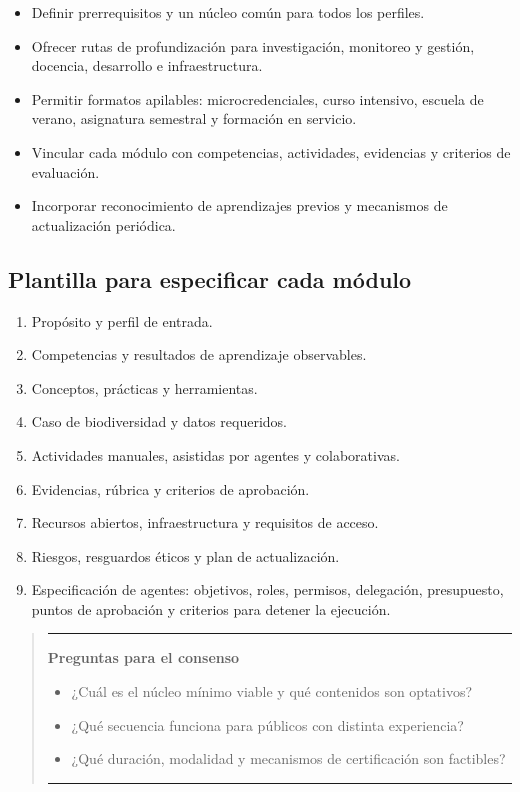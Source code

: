 \documentclass[11pt,a4paper]{article}
\newenvironment{preguntas}
  {\par\medskip\begin{quote}\color{azulieb}\hrule\smallskip
   \textbf{Preguntas para el consenso}\par\smallskip\begin{itemize}}
  {\end{itemize}\smallskip\hrule\end{quote}\par\medskip}
\begin{document}
\begin{itemize}
  \item Definir prerrequisitos y un núcleo común para todos los perfiles.
  \item Ofrecer rutas de profundización para investigación, monitoreo y gestión,
  docencia, desarrollo e infraestructura.
  \item Permitir formatos apilables: microcredenciales, curso intensivo, escuela
  de verano, asignatura semestral y formación en servicio.
  \item Vincular cada módulo con competencias, actividades, evidencias y criterios
  de evaluación.
  \item Incorporar reconocimiento de aprendizajes previos y mecanismos de
  actualización periódica.
\end{itemize}

\subsection{Plantilla para especificar cada módulo}

\begin{enumerate}
  \item Propósito y perfil de entrada.
  \item Competencias y resultados de aprendizaje observables.
  \item Conceptos, prácticas y herramientas.
  \item Caso de biodiversidad y datos requeridos.
  \item Actividades manuales, asistidas por agentes y colaborativas.
  \item Evidencias, rúbrica y criterios de aprobación.
  \item Recursos abiertos, infraestructura y requisitos de acceso.
  \item Riesgos, resguardos éticos y plan de actualización.
  \item Especificación de agentes: objetivos, roles, permisos, delegación,
  presupuesto, puntos de aprobación y criterios para detener la ejecución.
\end{enumerate}

\begin{preguntas}
  \item ¿Cuál es el núcleo mínimo viable y qué contenidos son optativos?
  \item ¿Qué secuencia funciona para públicos con distinta experiencia?
  \item ¿Qué duración, modalidad y mecanismos de certificación son factibles?
\end{preguntas}
\end{document}
